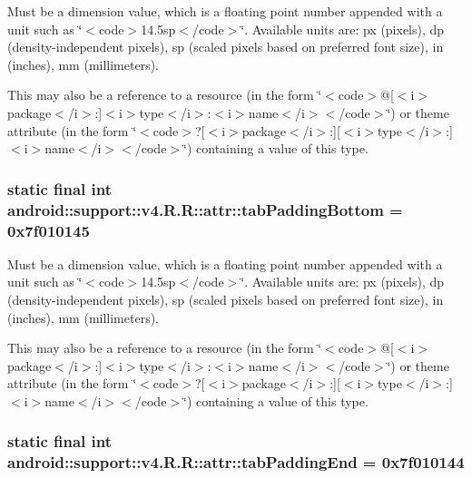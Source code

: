 Must be a dimension value, which is a floating point number appended with a unit such as \char`\"{}$<$code$>$14.5sp$<$/code$>$\char`\"{}. Available units are: px (pixels), dp (density-independent pixels), sp (scaled pixels based on preferred font size), in (inches), mm (millimeters). 

This may also be a reference to a resource (in the form \char`\"{}$<$code$>$@\mbox{[}$<$i$>$package$<$/i$>$:\mbox{]}$<$i$>$type$<$/i$>$:$<$i$>$name$<$/i$>$$<$/code$>$\char`\"{}) or theme attribute (in the form \char`\"{}$<$code$>$?\mbox{[}$<$i$>$package$<$/i$>$:\mbox{]}\mbox{[}$<$i$>$type$<$/i$>$:\mbox{]}$<$i$>$name$<$/i$>$$<$/code$>$\char`\"{}) containing a value of this type. \hypertarget{classandroid_1_1support_1_1v4_1_1_r_1_1attr_18991a8bcecb220375deb0c5aafd6216}{
\subsubsection[{tabPaddingBottom}]{\setlength{\rightskip}{0pt plus 5cm}static final int android::support::v4.R.R::attr::tabPaddingBottom = 0x7f010145}}
\label{classandroid_1_1support_1_1v4_1_1_r_1_1attr_18991a8bcecb220375deb0c5aafd6216}


Must be a dimension value, which is a floating point number appended with a unit such as \char`\"{}$<$code$>$14.5sp$<$/code$>$\char`\"{}. Available units are: px (pixels), dp (density-independent pixels), sp (scaled pixels based on preferred font size), in (inches), mm (millimeters). 

This may also be a reference to a resource (in the form \char`\"{}$<$code$>$@\mbox{[}$<$i$>$package$<$/i$>$:\mbox{]}$<$i$>$type$<$/i$>$:$<$i$>$name$<$/i$>$$<$/code$>$\char`\"{}) or theme attribute (in the form \char`\"{}$<$code$>$?\mbox{[}$<$i$>$package$<$/i$>$:\mbox{]}\mbox{[}$<$i$>$type$<$/i$>$:\mbox{]}$<$i$>$name$<$/i$>$$<$/code$>$\char`\"{}) containing a value of this type. \hypertarget{classandroid_1_1support_1_1v4_1_1_r_1_1attr_8875722550b099f83e12718568bb8fa4}{
\subsubsection[{tabPaddingEnd}]{\setlength{\rightskip}{0pt plus 5cm}static final int android::support::v4.R.R::attr::tabPaddingEnd = 0x7f010144}}
\label{classandroid_1_1support_1_1v4_1_1_r_1_1attr_8875722550b099f83e12718568bb8fa4}


